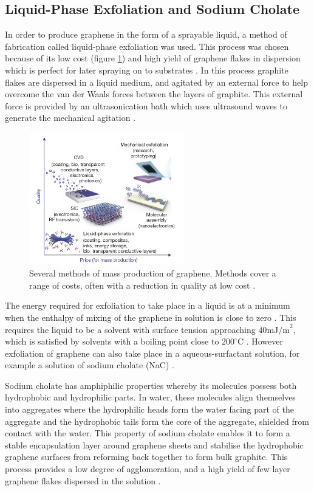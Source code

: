 \documentclass[12pt,titlepage]{article}
\begin{document}
	\subsection{Liquid-Phase Exfoliation and Sodium Cholate}
	In order to produce graphene in the form of a sprayable liquid, a method of fabrication called liquid-phase exfoliation was used. This process was chosen because of its low cost (figure \ref{fig:cost}) and high yield of graphene flakes in dispersion which is perfect for later spraying on to substrates \cite{De2010,Lotya2009a}. In this process graphite flakes are dispersed in a liquid medium, and agitated by an external force to help overcome the van der Waals forces between the layers of graphite. This external force is provided by an ultrasonication bath which uses ultrasound waves to generate the mechanical agitation \cite{Hasan2010}.
	
	\begin{figure}
		\centering
		\includegraphics[width=0.6\textwidth]{figures/cost.png}
		\caption[Methods of mass production of graphene.]{Several methods of mass production of graphene. Methods cover a range of costs, often with a reduction in quality at low cost \cite{Novoselov2012}.}
		\label{fig:cost}
	\end{figure}
	
	The energy required for exfoliation to take place in a liquid is at a minimum when the enthalpy of mixing of the graphene in solution is close to zero \cite{ONeill2011}. This requires the liquid to be a solvent with surface tension approaching $40 \text{mJ/m}^2$, which is satisfied by solvents with a boiling point close to $200^{\circ}$C \cite{Coleman2008a,Lee2009}. However exfoliation of graphene can also take place in a aqueous-surfactant solution, for example a solution of sodium cholate (NaC) \cite{Lotya2009a,Yumin2011a}. 
	
	Sodium cholate has amphiphilic properties whereby its molecules possess both hydrophobic and hydrophilic parts. In water, these molecules align themselves into aggregates where the hydrophilic heads form the water facing part of the aggregate and the hydrophobic tails form the core of the aggregate, shielded from contact with the water. This property of sodium cholate enables it to form a stable encapsulation layer around graphene sheets and stabilise the hydrophobic graphene surfaces \cite{Wang2009} from reforming back together to form bulk graphite. This process provides a low degree of agglomeration, and a high yield of few layer graphene flakes dispersed in the solution \cite{De2010}.
	
\end{document}
